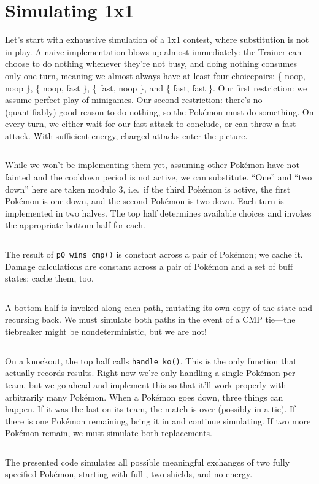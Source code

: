 \section{Simulating 1x1\label{sec:simul1x1}}
Let's start with exhaustive simulation of a 1x1 contest,
 where substitution is not in play.
A naive implementation blows up almost immediately: the Trainer can choose to do nothing
 whenever they're not busy, and doing nothing consumes only one turn,
 meaning we almost always have at least four choicepairs:
 \{ noop, noop \}, \{ noop, fast \}, \{ fast, noop \}, and \{ fast, fast \}.
Our first restriction: we assume perfect play of minigames.
Our second restriction: there's no (quantifiably) good reason to do nothing,
 so the Pokémon must do something.
On every turn, we either wait for our fast attack to conclude, or can throw a fast attack.
With sufficient energy, charged attacks enter the picture.
\inputminted{cpp}{s/sift.h}
While we won't be implementing them yet, assuming other Pokémon have not
  fainted and the cooldown period is not active, we can substitute.
``One'' and ``two down'' here are taken modulo 3, i.e.\ if the third Pokémon is
  active, the first Pokémon is one down, and the second Pokémon is two down.
Each turn is implemented in two halves.
The top half determines available choices and invokes the appropriate bottom half for each.
\inputminted{cpp}{s/top.h}
The result of \texttt{p0\_wins\_cmp()} is constant across a pair of Pokémon; we cache it.
Damage calculations are constant across a pair of Pokémon and a set of buff states; cache them, too.
\inputminted{cpp}{s/in.h}
A bottom half is invoked along each path, mutating its own copy of the state and recursing back.
We must simulate both paths in the event of a CMP tie---the tiebreaker might be nondeterministic, but we are not!
\inputminted{cpp}{s/bottom.h}
On a knockout, the top half calls \texttt{handle\_ko()}.
This is the only function that actually records results.
Right now we're only handling a single Pokémon per team, but we go ahead and implement this so that it'll work properly
 with arbitrarily many Pokémon.
When a Pokémon goes down, three things can happen.
If it was the last on its team, the match is over (possibly in a tie).
If there is one Pokémon remaining, bring it in and continue simulating.
If two more Pokémon remain, we must simulate both replacements.
\inputminted{cpp}{s/ko.h}
The presented code simulates all possible meaningful exchanges of two fully specified Pokémon, starting
  with full \HP{}, two shields, and no energy.



